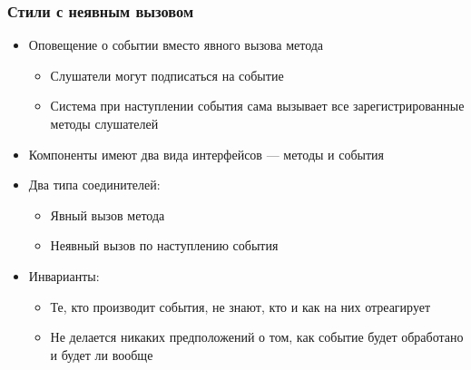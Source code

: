 \documentclass{../../slides-style}
\begin{document}
    \begin{frame}
        \frametitle{Стили с неявным вызовом}
        \begin{itemize}
            \item Оповещение о событии вместо явного вызова метода
            \begin{itemize}
                \item Слушатели могут подписаться на событие
                \item Система при наступлении события сама вызывает все зарегистрированные методы слушателей
            \end{itemize}
            \item Компоненты имеют два вида интерфейсов --- методы и события
            \item Два типа соединителей:
            \begin{itemize}
                \item Явный вызов метода
                \item Неявный вызов по наступлению события
            \end{itemize}
            \item Инварианты:
            \begin{itemize}
                \item Те, кто производит события, не знают, кто и как на них отреагирует
                \item Не делается никаких предположений о том, как событие будет обработано и будет ли вообще
            \end{itemize}
        \end{itemize}
    \end{frame}
\end{document}
